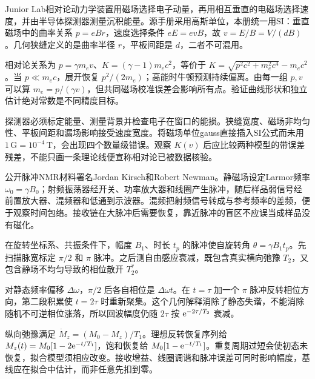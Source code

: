 Junior Lab相对论动力学装置用磁场选择电子动量，再用相互垂直的电磁场选择速度，并由半导体探测器测量沉积能量。源手册采用高斯单位，本册统一用SI：垂直磁场中的曲率关系 $p=eBr$，速度选择条件 $eE=evB$，故 $v=E/B=V/(dB)$。几何狭缝定义的是曲率半径 $r$，平板间距是 $d$，二者不可混用。

相对论关系为 $p=\gamma m_ev$、$K=(\gamma-1)m_ec^2$，等价于 $K=\sqrt{p^2c^2+m_e^2c^4}-m_ec^2$。当 $p\ll m_ec$，展开恢复 $p^2/(2m_e)$；高能时牛顿预测持续偏离。由每一组 $p,v$ 可以算 $m_e=p/(\gamma v)$，但共同磁场校准误差会影响所有点。验证曲线形状和独立估计绝对常数是不同精度目标。

探测器必须标定能量、测量背景并检查电子在窗口的能损。狭缝宽度、磁场非均匀性、平板间距和漏场影响接受速度宽度。将磁场单位gauss直接插入SI公式而未用 $1\,\mathrm G=10^{-4}\,\mathrm T$，会出现四个数量级错误。观察 $K(v)$ 后应比较两种模型的带误差残差，不能只画一条理论线便宣称相对论已被数据核验。

公开脉冲NMR材料署名Jordan Kirsch和Robert Newman。静磁场设定Larmor频率 $\omega_0=\gamma B_0$；射频振荡器经开关、功率放大器和线圈产生脉冲，随后样品弱信号经前置放大器、混频器和低通到示波器。混频把射频信号转成与参考频率的差频，便于观察时间包络。接收链在大脉冲后需要恢复，靠近脉冲的盲区不应误当成样品没有磁化。

在旋转坐标系、共振条件下，幅度 $B_1$、时长 $t_p$ 的脉冲使自旋转角 $\theta=\gamma B_1t_p$。先扫描脉宽标定 $\pi/2$ 和 $\pi$ 脉冲。之后测自由感应衰减，既包含真实横向弛豫 $T_2$，又包含静场不均匀导致的相位散开 $T_2^*$。

对静态频率偏移 $\Delta\omega$，$\pi/2$ 后各自相位是 $\Delta\omega t$。在 $t=\tau$ 加一个 $\pi$ 脉冲反转相位方向，第二段积累使 $t=2\tau$ 时重新聚集。这个几何解释消除了静态失谐，不能消除随机不可逆相位涨落，所以回波幅度仍随 $2\tau$ 按 $\mathrm e^{-2\tau/T_2}$ 衰减。

纵向弛豫满足 $\dot M_z=(M_0-M_z)/T_1$。理想反转恢复序列给 $M_z(t)=M_0[1-2\mathrm e^{-t/T_1}]$，饱和恢复给 $M_0[1-\mathrm e^{-t/T_1}]$。重复周期过短会使初态未恢复，拟合模型须相应改变。接收增益、线圈调谐和脉冲误差可同时影响幅度，基线应在拟合中估计，而非任意先扣到零。

\begin{center}\end{center}


